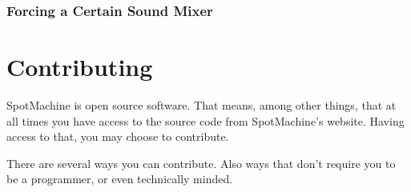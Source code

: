 \documentclass[a4paper,12pt]{report}
\begin{document}
\subsection{Forcing a Certain Sound Mixer}

\chapter{Contributing}

SpotMachine is open source software. That means, among other things, that at all
times you have access to the source code from SpotMachine's website. Having
access to that, you may choose to contribute.

There are several ways you can contribute. Also ways that don't require you to
be a programmer, or even technically minded.

\end{document}
